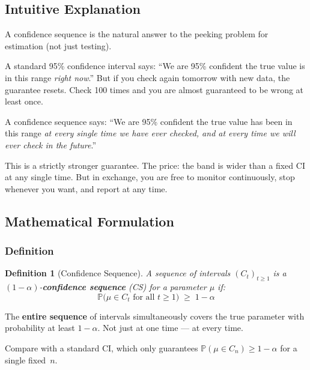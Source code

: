 \documentclass[12pt, a4paper]{article}
\newtheorem{definition}{Definition}
\newcommand{\Prob}{\mathbb{P}}         %
\begin{document}
\subsection{Intuitive Explanation}

\begin{intuition}
A confidence sequence is the natural answer to the peeking problem for
estimation (not just testing).

A standard 95\% confidence interval says: ``We are 95\% confident the true
value is in this range \emph{right now}.''  But if you check again tomorrow
with new data, the guarantee resets.  Check 100 times and you are almost
guaranteed to be wrong at least once.

A confidence sequence says: ``We are 95\% confident the true value has been
in this range \emph{at every single time we have ever checked, and at every
time we will ever check in the future}.''

This is a strictly stronger guarantee.  The price: the band is wider than a
fixed CI at any single time.  But in exchange, you are free to monitor
continuously, stop whenever you want, and report at any time.
\end{intuition}

\subsection{Mathematical Formulation}

\subsubsection*{Definition}

\begin{definition}[Confidence Sequence]
A sequence of intervals $(C_t)_{t \geq 1}$ is a $(1-\alpha)$-\textbf{confidence
sequence} (CS) for a parameter $\mu$ if:
\[
  \boxed{\Prob\!\bigl(\mu \in C_t \text{ for all } t \geq 1\bigr) \;\geq\; 1-\alpha}
\]
\end{definition}

\begin{plainlanguage}
The \textbf{entire sequence} of intervals simultaneously covers the true
parameter with probability at least $1-\alpha$.  Not just at one time ---
at every time.
\end{plainlanguage}

Compare with a standard CI, which only guarantees $\Prob(\mu \in C_n) \geq
1-\alpha$ for a single fixed~$n$.
\end{document}
